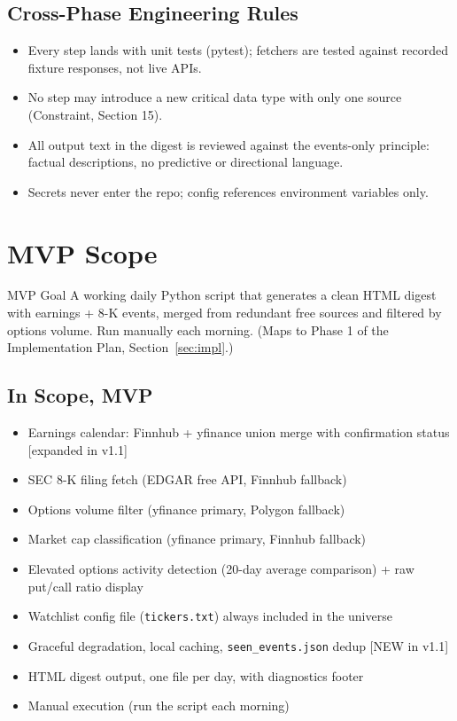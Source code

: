\documentclass[11pt]{article}
\begin{document}
\subsection{Cross-Phase Engineering Rules}
\begin{itemize}
  \item Every step lands with unit tests (pytest); fetchers are tested against recorded fixture responses, not live APIs.
  \item No step may introduce a new critical data type with only one source (Constraint, Section 15).
  \item All output text in the digest is reviewed against the events-only principle: factual descriptions, no predictive or directional language.
  \item Secrets never enter the repo; config references environment variables only.
\end{itemize}

\section{MVP Scope}

\begin{callout}{MVP Goal}
A working daily Python script that generates a clean HTML digest with earnings + 8-K events, merged from redundant free sources and filtered by options volume. Run manually each morning. (Maps to Phase 1 of the Implementation Plan, Section~\ref{sec:impl}.)
\end{callout}

\subsection{In Scope, MVP}
\begin{itemize}
  \item Earnings calendar: Finnhub + yfinance union merge with confirmation status \hfill [expanded in v1.1]
  \item SEC 8-K filing fetch (EDGAR free API, Finnhub fallback)
  \item Options volume filter (yfinance primary, Polygon fallback)
  \item Market cap classification (yfinance primary, Finnhub fallback)
  \item Elevated options activity detection (20-day average comparison) + raw put/call ratio display
  \item Watchlist config file (\texttt{tickers.txt}) always included in the universe
  \item Graceful degradation, local caching, \texttt{seen\_events.json} dedup \hfill [NEW in v1.1]
  \item HTML digest output, one file per day, with diagnostics footer
  \item Manual execution (run the script each morning)
\end{itemize}
\end{document}
